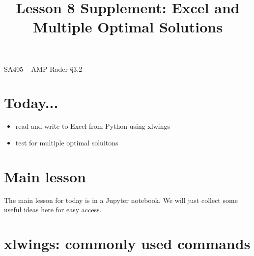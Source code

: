 \documentclass[11pt]{article}
\makeatletter
\theoremstyle{definition}
\renewcommand{\maketitle}{
  \noindent SA405 -- AMP \hfill Rader \S 3.2 \\

  \begin{center}\Large{\textbf{\@title}}\end{center}
}
\makeatother
\begin{document}
  
\title{Lesson 8  Supplement:  Excel and Multiple Optimal Solutions}

\maketitle

\section{Today...}

\begin{itemize}
	\item  read and write to Excel from Python using xlwings
	\item  test for multiple optimal soluitons
\end{itemize}

\section{Main lesson}
The main lesson for today is in a Jupyter notebook.  We will just collect some useful ideas here for easy access.

\section{xlwings: commonly used commands}
\end{document}

